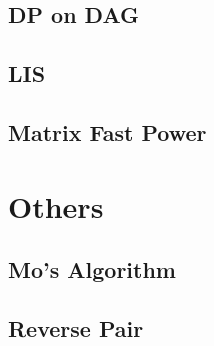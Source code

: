 \documentclass[a4paper,10pt,twocolumn,oneside]{article}
\begin{document}
\subsection{DP on DAG}


\subsection{LIS}


\subsection{Matrix Fast Power}


\section{Others}

\subsection{Mo's Algorithm}


\subsection{Reverse Pair}



%

%

%

%
\end{document}
